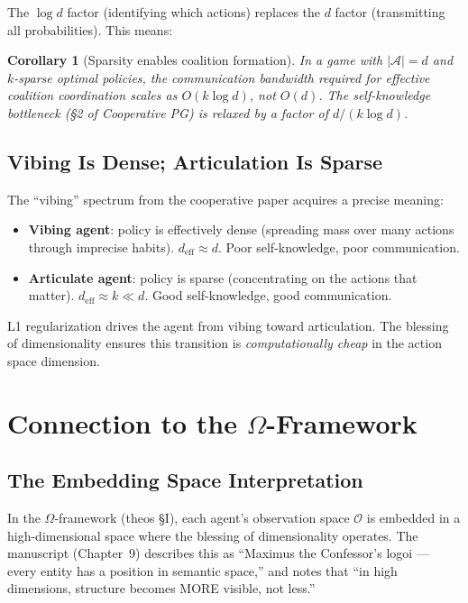 \documentclass[11pt,a4paper]{article}
\newtheorem{corollary}[theorem]{Corollary}
\begin{document}
The $\log d$ factor (identifying which actions) replaces the $d$ factor
(transmitting all probabilities). This means:

\begin{corollary}[Sparsity enables coalition formation]
In a game with $|\mathcal{A}| = d$ and $k$-sparse optimal policies,
the communication bandwidth required for effective coalition coordination
scales as $O(k \log d)$, not $O(d)$. The self-knowledge bottleneck
(\S2 of Cooperative PG) is relaxed by a factor of $d / (k \log d)$.
\end{corollary}

\subsection{Vibing Is Dense; Articulation Is Sparse}

The ``vibing'' spectrum from the cooperative paper acquires a precise meaning:
\begin{itemize}
  \item \textbf{Vibing agent}: policy is effectively dense (spreading mass
    over many actions through imprecise habits). $d_{\text{eff}} \approx d$.
    Poor self-knowledge, poor communication.
  \item \textbf{Articulate agent}: policy is sparse (concentrating on the
    actions that matter). $d_{\text{eff}} \approx k \ll d$.
    Good self-knowledge, good communication.
\end{itemize}

L1 regularization drives the agent from vibing toward articulation.
The blessing of dimensionality ensures this transition is
\emph{computationally cheap} in the action space dimension.


\section{Connection to the $\Omega$-Framework}

\subsection{The Embedding Space Interpretation}

In the $\Omega$-framework (theos \S I), each agent's observation space
$\mathcal{O}$ is embedded in a high-dimensional space where the blessing
of dimensionality operates. The manuscript (Chapter~9) describes this
as ``Maximus the Confessor's logoi --- every entity has a position in
semantic space,'' and notes that ``in high dimensions, structure becomes
MORE visible, not less.''
\end{document}
